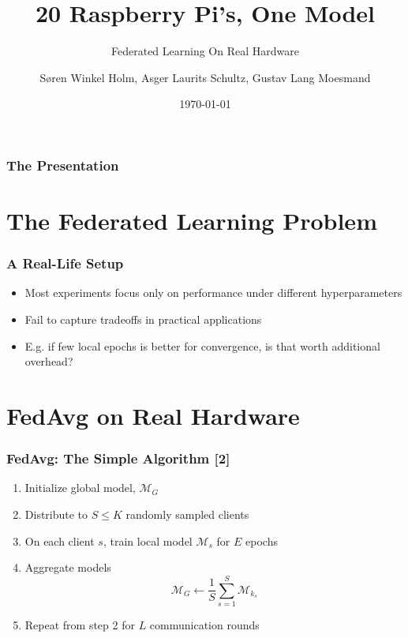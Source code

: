 \documentclass{beamer}
\title{20 Raspberry Pi's, One Model}
\subtitle{
    Federated Learning On Real Hardware
}
\author[Søren Holm, Asger Schultz, Gustav Moesmand]
{Søren Winkel Holm, Asger Laurits Schultz, Gustav Lang Moesmand}
\institute[DTU]{Technical University of Denmark}
\date{\today}
\begin{document}
\begin{frame}
    \titlepage
\end{frame}

\begin{frame}
    \frametitle{The Presentation}
    \footnotesize
    \tableofcontents
\end{frame}

\section{The Federated Learning Problem}
\begin{frame}
\end{frame}

\begin{frame}
    \frametitle{A Real-Life Setup}
    \noindent
    \parbox[t]{6cm}{
        \begin{itemize}
            \item Most experiments focus only on performance under different hyperparameters
            \item Fail to capture tradeoffs in practical applications
            \item E.g. if few local epochs is better for convergence, is that worth additional overhead?
        \end{itemize}    
    }
    \hfill
\end{frame}

\section{FedAvg on Real Hardware}
\begin{frame}
    \frametitle{FedAvg: The Simple Algorithm [2]}
    \begin{enumerate}
        \item Initialize global model, $\mathcal M_G$
        \item Distribute to $S \le K$ randomly sampled clients
        \item On each client $s$, train local model $\mathcal M_s$ for $E$ epochs
        \item Aggregate models
    \begin{equation*}
        \mathcal M_G \gets \frac{1}{S} \sum_{s=1}^{S} \mathcal M_{k_s}
    \end{equation*}
        \item Repeat from step 2 for $L$ communication rounds
    \end{enumerate}
\end{frame}
\end{document}
